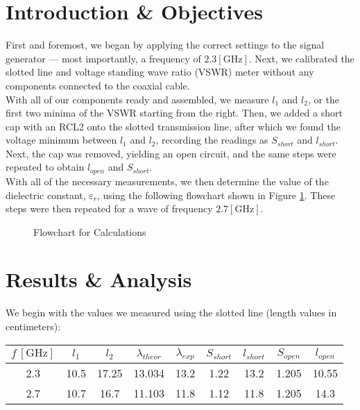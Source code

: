 \documentclass[
	letterpaper, %
	10pt, %
]{CSUniSchoolLabReport}
\begin{document}
\section{Introduction \& Objectives}

First and foremost, we began by applying the correct settings to the signal generator — most importantly, a frequency of $2.3[\si{\giga\hertz}]$. Next, we calibrated the slotted line and voltage standing wave ratio (VSWR) meter without any components connected to the coaxial cable. \\

With all of our components ready and assembled, we measure $l_1$ and $l_2$, or the first two minima of the VSWR starting from the right. Then, we added a short cap with an RCL2 onto the slotted transmission line, after which we found the voltage minimum between $l_1$ and $l_2$, recording the readings as $S_{short}$ and $l_{short}$. Next, the cap was removed, yielding an open circuit, and the same steps were repeated to obtain $l_{open}$ and $S_{short}$.\\

With all of the necessary measurements, we then determine the value of the dielectric constant, $\varepsilon_r$, using the following flowchart shown in Figure \ref{fig:1}. These steps were then repeated for a wave of frequency $2.7[\si{\giga\hertz}]$.

\begin{figure}[H]
  \centering
  
  \caption{Flowchart for Calculations}
  \label{fig:1}
\end{figure}

\section{Results \& Analysis} 

We begin with the values we measured using the slotted line (length values in centimeters):

\begin{center}
\begin{tabular}[h!]{|c|c|c|c|c|c|c|c|c|}
  \hline
  $f\,[\si{\giga\hertz}]$ & $l_1$ & $l_2$ & $\lambda_{theor}$ & $\lambda_{exp}$ & $S_{short}$ & $l_{short}$ & $S_{open}$ & $l_{open}$\\
  \hline
  2.3 & 10.5 & 17.25 & 13.034 & 13.2 & 1.22 & 13.2 & 1.205 & 10.55\\
  \hline
  2.7 & 10.7 & 16.7 & 11.103 & 11.8 & 1.12 & 11.8 & 1.205 & 14.3\\
  \hline
\end{tabular}
\end{center}
\end{document}
